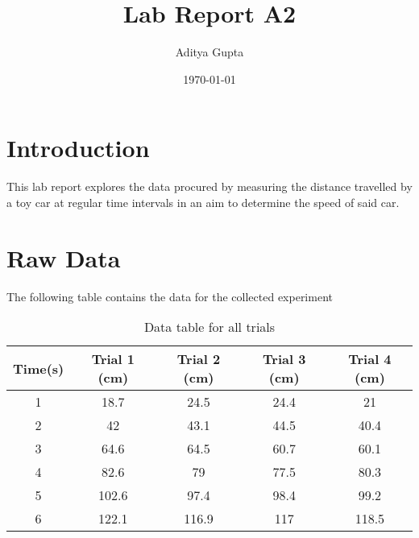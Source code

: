 \documentclass[12pt, letterpaper]{article}
\title{Lab Report A2}
\author{Aditya Gupta}
\date{\today}
\begin{document}
\maketitle
\newpage
\tableofcontents
\newpage
\section{Introduction}
This lab report explores the data procured by measuring the distance travelled by a toy car at regular time intervals in an aim to determine the speed of said car.
\section{Raw Data}
The following table contains the data for the collected experiment
\begin{table}[h!]
\centering
\begin{tabular}{|c|c|c|c|c|}
\hline
\textbf{Time(s)} & \textbf{Trial 1 (cm)} & \textbf{Trial 2 (cm)} & \textbf{Trial 3 (cm)} & \textbf{Trial 4 (cm)} \\ \hline
1                & 18.7       & 24.5       & 24.4       & 21         \\ \hline
2                & 42         & 43.1       & 44.5       & 40.4       \\ \hline
3                & 64.6       & 64.5       & 60.7       & 60.1       \\ \hline
4                & 82.6       & 79         & 77.5       & 80.3       \\ \hline
5                & 102.6      & 97.4       & 98.4       & 99.2       \\ \hline
6                & 122.1      & 116.9      & 117        & 118.5      \\ \hline
\end{tabular}
\caption{Data table for all trials}
\end{table}
\end{document}
